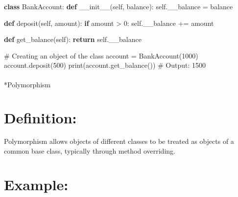 \documentclass[
  letterpaper,
  DIV=11,
  numbers=noendperiod]{scrreprt}
\makeatletter
\let\oldparagraph\paragraph
\renewcommand{\paragraph}{
    \@ifstar
      \xxxParagraphStar
      \xxxParagraphNoStar
  }
\newcommand{\xxxParagraphStar}[1]{\oldparagraph*{#1}\mbox{}}
\newcommand{\xxxParagraphNoStar}[1]{\oldparagraph{#1}\mbox{}}
\newenvironment{Shaded}{\begin{snugshade}}{\end{snugshade}}
\newcommand{\BuiltInTok}[1]{\textcolor[rgb]{0.00,0.23,0.31}{#1}}
\newcommand{\CommentTok}[1]{\textcolor[rgb]{0.37,0.37,0.37}{#1}}
\newcommand{\ControlFlowTok}[1]{\textcolor[rgb]{0.00,0.23,0.31}{\textbf{#1}}}
\newcommand{\DecValTok}[1]{\textcolor[rgb]{0.68,0.00,0.00}{#1}}
\newcommand{\FunctionTok}[1]{\textcolor[rgb]{0.28,0.35,0.67}{#1}}
\newcommand{\KeywordTok}[1]{\textcolor[rgb]{0.00,0.23,0.31}{\textbf{#1}}}
\newcommand{\NormalTok}[1]{\textcolor[rgb]{0.00,0.23,0.31}{#1}}
\newcommand{\OperatorTok}[1]{\textcolor[rgb]{0.37,0.37,0.37}{#1}}
\newcommand{\VariableTok}[1]{\textcolor[rgb]{0.07,0.07,0.07}{#1}}
\makeatother
\begin{document}
\begin{Shaded}
\begin{Highlighting}[]
\KeywordTok{class}\NormalTok{ BankAccount: }
  \KeywordTok{def} \FunctionTok{\_\_init\_\_}\NormalTok{(}\VariableTok{self}\NormalTok{, balance):}
  \VariableTok{self}\NormalTok{.\_\_balance }\OperatorTok{=}\NormalTok{ balance}

  \KeywordTok{def}\NormalTok{ deposit(}\VariableTok{self}\NormalTok{, amount):}
      \ControlFlowTok{if}\NormalTok{ amount }\OperatorTok{\textgreater{}} \DecValTok{0}\NormalTok{:}
          \VariableTok{self}\NormalTok{.\_\_balance }\OperatorTok{+=}\NormalTok{ amount}

  \KeywordTok{def}\NormalTok{ get\_balance(}\VariableTok{self}\NormalTok{):}
      \ControlFlowTok{return} \VariableTok{self}\NormalTok{.\_\_balance}

\CommentTok{\# Creating an object of the class}
\NormalTok{account }\OperatorTok{=}\NormalTok{ BankAccount(}\DecValTok{1000}\NormalTok{)}
\NormalTok{account.deposit(}\DecValTok{500}\NormalTok{)}
\BuiltInTok{print}\NormalTok{(account.get\_balance())  }\CommentTok{\# Output: 1500}
\end{Highlighting}
\end{Shaded}

\paragraph*{Polymorphism}\label{polymorphism}

\section{Definition:}

Polymorphism allows objects of different classes to be treated as
objects of a common base class, typically through method overriding.

\section{Example:}
\end{document}
